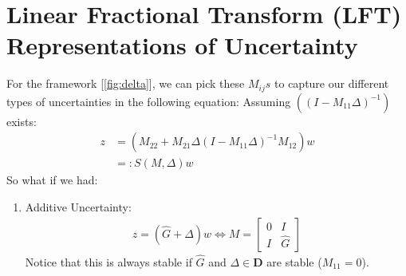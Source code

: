 \documentclass{article}[12pt]
\begin{document}
\section{Linear Fractional Transform (LFT) Representations of Uncertainty}
For the framework [\ref{fig:delta}], we can pick these $M_{ij}s$ to capture our different types of uncertainties in the following equation:
Assuming $((I - M_{11}\Delta)^{-1})$ exists:
\begin{align*}
        z &= (M_{22} + M_{21}\Delta(I - M_{11}\Delta)^{-1}M_{12})w\\
    &=: S(M,\Delta)w
\end{align*}
So what if we had:
\begin{enumerate}
    \item Additive Uncertainty:
    \begin{align*}
        z = (\hat{G} + \Delta)w \Longleftrightarrow M = \begin{bmatrix}0& I\\I & \hat{G}\end{bmatrix}
    \end{align*}
    Notice that this is always stable if $\hat{G}$ and $\Delta \in \textbf{D}$ are stable ($M_{11} = 0$).
    

\end{enumerate}
\end{document}
